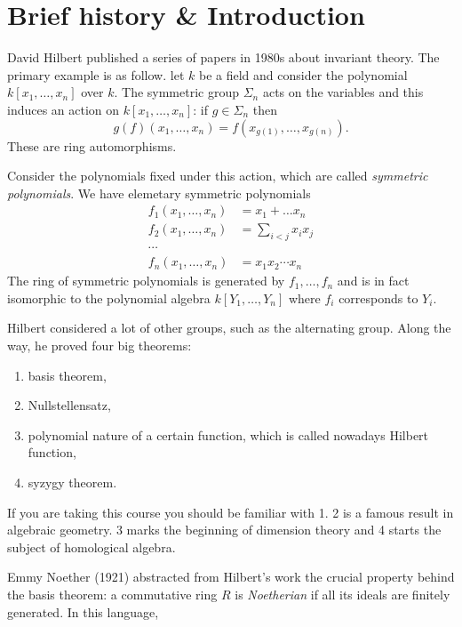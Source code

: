\documentclass[a4paper]{article}
\begin{document}


\tableofcontents

\setcounter{section}{-1}

\section{Brief history \& Introduction}

David Hilbert published a series of papers in 1980s about invariant theory. The primary example is as follow. let \(k\)  be a field and consider the polynomial \(k[x_1, \dots, x_n]\) over \(k\). The symmetric group \(\Sigma_n\) acts on the variables and this induces an action on \(k[x_1, \dots, x_n]\): if \(g \in \Sigma_n\) then
\[
  g(f)(x_1, \dots, x_n) = f(x_{g(1)}, \dots, x_{g(n)}).
\]
These are ring automorphisms.

Consider the polynomials fixed under this action, which are called \emph{symmetric polynomials}. We have elemetary symmetric polynomials
\begin{align*}
  f_1(x_1, \dots, x_n) &= x_1 + \dots x_n \\
  f_2(x_1, \dots, x_n) &= \sum_{i < j} x_i x_j \\
  \cdots & \\
  f_n(x_1, \dots, x_n) &= x_1x_2 \cdots x_n
\end{align*}
The ring of symmetric polynomials is generated by \(f_1, \dots, f_n\) and is in fact isomorphic to the polynomial algebra \(k[Y_1, \dots, Y_n]\) where \(f_i\) corresponds to \(Y_i\).

Hilbert considered a lot of other groups, such as the alternating group. Along the way, he proved four big theorems:
\begin{enumerate}
\item basis theorem,
\item Nullstellensatz,
\item polynomial nature of a certain function, which is called nowadays Hilbert function,
\item syzygy theorem.
\end{enumerate}
If you are taking this course you should be familiar with 1. 2 is a famous result in algebraic geometry. 3 marks the beginning of dimension theory and 4 starts the subject of homological algebra.

Emmy Noether (1921) abstracted from Hilbert's work the crucial property behind the basis theorem: a commutative ring \(R\) is \emph{Noetherian} if all its ideals are finitely generated. In this language,
\end{document}
